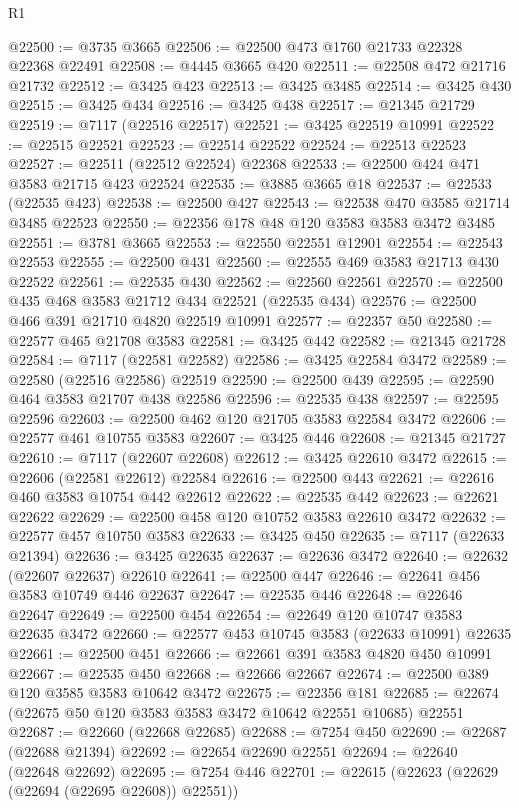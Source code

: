 \begin{lexlean}{R1}
\begin{coremodule}
@22500 := @3735 @3665
@22506 := @22500 @473 @1760 @21733 @22328 @22368 @22491
@22508 := @4445 @3665 @420
@22511 := @22508 @472 @21716 @21732
@22512 := @3425 @423
@22513 := @3425 @3485
@22514 := @3425 @430
@22515 := @3425 @434
@22516 := @3425 @438
@22517 := @21345 @21729
@22519 := @7117 (@22516 @22517)
@22521 := @3425 @22519 @10991
@22522 := @22515 @22521
@22523 := @22514 @22522
@22524 := @22513 @22523
@22527 := @22511 (@22512 @22524) @22368
@22533 := @22500 @424 @471 @3583 @21715 @423 @22524
@22535 := @3885 @3665 @18
@22537 := @22533 (@22535 @423)
@22538 := @22500 @427
@22543 := @22538 @470 @3585 @21714 @3485 @22523
@22550 := @22356 @178 @48 @120 @3583 @3583 @3472 @3485
@22551 := @3781 @3665
@22553 := @22550 @22551 @12901
@22554 := @22543 @22553
@22555 := @22500 @431
@22560 := @22555 @469 @3583 @21713 @430 @22522
@22561 := @22535 @430
@22562 := @22560 @22561
@22570 := @22500 @435 @468 @3583 @21712 @434 @22521 (@22535 @434)
@22576 := @22500 @466 @391 @21710 @4820 @22519 @10991
@22577 := @22357 @50
@22580 := @22577 @465 @21708 @3583
@22581 := @3425 @442
@22582 := @21345 @21728
@22584 := @7117 (@22581 @22582)
@22586 := @3425 @22584 @3472
@22589 := @22580 (@22516 @22586) @22519
@22590 := @22500 @439
@22595 := @22590 @464 @3583 @21707 @438 @22586
@22596 := @22535 @438
@22597 := @22595 @22596
@22603 := @22500 @462 @120 @21705 @3583 @22584 @3472
@22606 := @22577 @461 @10755 @3583
@22607 := @3425 @446
@22608 := @21345 @21727
@22610 := @7117 (@22607 @22608)
@22612 := @3425 @22610 @3472
@22615 := @22606 (@22581 @22612) @22584
@22616 := @22500 @443
@22621 := @22616 @460 @3583 @10754 @442 @22612
@22622 := @22535 @442
@22623 := @22621 @22622
@22629 := @22500 @458 @120 @10752 @3583 @22610 @3472
@22632 := @22577 @457 @10750 @3583
@22633 := @3425 @450
@22635 := @7117 (@22633 @21394)
@22636 := @3425 @22635
@22637 := @22636 @3472
@22640 := @22632 (@22607 @22637) @22610
@22641 := @22500 @447
@22646 := @22641 @456 @3583 @10749 @446 @22637
@22647 := @22535 @446
@22648 := @22646 @22647
@22649 := @22500 @454
@22654 := @22649 @120 @10747 @3583 @22635 @3472
@22660 := @22577 @453 @10745 @3583 (@22633 @10991) @22635
@22661 := @22500 @451
@22666 := @22661 @391 @3583 @4820 @450 @10991
@22667 := @22535 @450
@22668 := @22666 @22667
@22674 := @22500 @389 @120 @3585 @3583 @10642 @3472
@22675 := @22356 @181
@22685 := @22674 (@22675 @50 @120 @3583 @3583 @3472 @10642 @22551 @10685) @22551
@22687 := @22660 (@22668 @22685)
@22688 := @7254 @450
@22690 := @22687 (@22688 @21394)
@22692 := @22654 @22690 @22551
@22694 := @22640 (@22648 @22692)
@22695 := @7254 @446
@22701 := @22615 (@22623 (@22629 (@22694 (@22695 @22608)) @22551))

\end{coremodule}
\end{lexlean}
